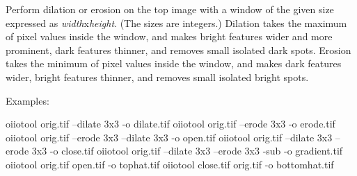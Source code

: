 Perform dilation or erosion on the top image with a window of the given size
expressed as \emph{width}{\cf x}\emph{height}. (The sizes are integers.)
Dilation takes the maximum of pixel values inside the window, and makes
bright features wider and more prominent, dark features thinner, and removes
small isolated dark spots. Erosion takes the minimum of pixel values inside
the window, and makes dark features wider, bright features thinner, and
removes small isolated bright spots.

\noindent Examples:
\begin{code}
    oiiotool orig.tif --dilate 3x3 -o dilate.tif
    oiiotool orig.tif --erode 3x3 -o erode.tif
    oiiotool orig.tif --erode 3x3 --dilate 3x3 -o open.tif
    oiiotool orig.tif --dilate 3x3 --erode 3x3 -o close.tif
    oiiotool orig.tif --dilate 3x3 --erode 3x3 -sub -o gradient.tif
    oiiotool orig.tif open.tif -o tophat.tif
    oiiotool close.tif orig.tif -o bottomhat.tif
\end{code}

